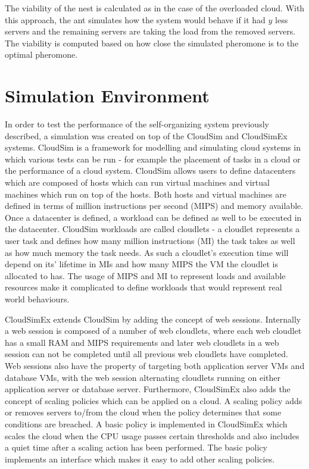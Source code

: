 \documentclass[conference]{IEEEtran}
\begin{document}
The viability of the nest is calculated as in the case of the overloaded cloud. With this approach, the ant simulates how the system would behave if it had $y$ less servers and the remaining servers are taking the load from the removed servers. The viability is computed based on how close the simulated pheromone is to the optimal pheromone.

\section{Simulation Environment}
\label{sec:testbed}

In order to test the performance of the self-organizing system previously described, a simulation was created on top of the CloudSim and CloudSimEx systems. CloudSim is a framework for modelling and simulating cloud systems in which various tests can be run - for example the placement of tasks in a cloud or the performance of a cloud system. CloudSim allows users to define datacenters which are composed of hosts which can run virtual machines and virtual machines which run on top of the hosts. Both hosts and virtual machines are defined in terms of million instructions per second (MIPS) and memory available. Once a datacenter is defined, a workload can be defined as well to be executed in the datacenter. CloudSim workloads are called cloudlets - a cloudlet represents a user task and defines how many million instructions (MI) the task takes as well as how much memory the task needs. As such a cloudlet's execution time will depend on its' lifetime in MIs and how many MIPS the VM the cloudlet is allocated to has. The usage of MIPS and MI to represent loads and available resources make it complicated to define workloads that would represent real world behaviours.

CloudSimEx extends CloudSim by adding the concept of web sessions. Internally a web session is composed of a number of web cloudlets, where each web cloudlet has a small RAM and MIPS requirements and later web cloudlets in a web session can not be completed until all previous web cloudlets have completed. Web sessions also have the property of targeting both application server VMs and database VMs, with the web session alternating cloudlets running on either application server or database server. Furthermore, CloudSimEx also adds the concept of scaling policies which can be applied on a cloud. A scaling policy adds or removes servers to/from the cloud when the policy determines that some conditions are breached. A basic policy is implemented in CloudSimEx which scales the cloud when the CPU usage passes certain thresholds and also includes a quiet time after a scaling action has been performed. The basic policy implements an interface which makes it easy to add other scaling policies. 
\end{document}

